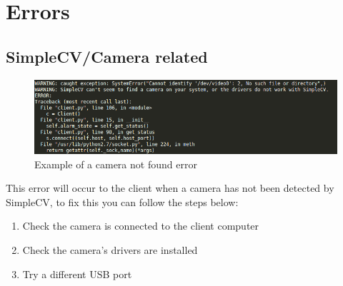 \documentclass[a4paper]{article}
\begin{document}
\section{Errors}
    \subsection{SimpleCV/Camera related}
        \begin{figure}[H]
            \centering
            \caption{Example of a camera not found error}
            \label{fig:camera404}
                \includegraphics[scale=0.5]{../shared_assets/screenshots/manual/camera404.png}
        \end{figure} 
        This error will occur to the client when a camera has not been detected by SimpleCV, to fix this you can follow the steps below:
        \begin{enumerate}
            \item Check the camera is connected to the client computer
            \item Check the camera's drivers are installed
            \item Try a different USB port
        \end{enumerate}
\end{document}
